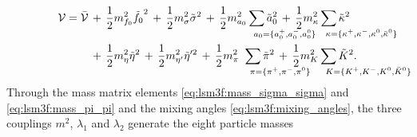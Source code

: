 \begin{equation}
\begin{split}
	\pot = \bar{\pot} \, &+ \, \frac12 m^2_{f_0} \tilde{f_0}^2  \, + \, \frac12 m^2_{\sigma} \tilde{\sigma}^2 \, + \, \frac12 m^2_{a_0} \sum_{\mathrlap{\!\!a_0 = \{a_0^+,a_0^-,a_0^0\}}} \tilde{a}_0^2               \, + \, \frac12 m^2_{\kappa} \sum_{\mathrlap{\!\!\kappa = \{\kappa^+,\kappa^-,\kappa^0,\bar{\kappa}^0\}}} \tilde{\kappa}^2 \\
	                  \, &+ \, \frac12 m^2_{\eta} \tilde{\eta}^2 \, + \, \frac12 m^2_{\eta'} \tilde{\eta}'^2   \, + \, \frac12 m^2_{\pi_{\phantom{0}}} \sum_{\mathrlap{\!\!\pi = \{\pi^+,\pi^-,\pi^0\}}} \tilde{\pi}^2 \, + \, \frac12 m^2_{K} \sum_{\mathrlap{\!\!K = \{K^+,K^-,K^0,\bar{K}^0\}}} \tilde{K}^2. \\
\end{split}
\label{eq:lsm3f:potential_after_diagonalization}
\end{equation}
Through the mass matrix elements \eqref{eq:lsm3f:mass_sigma_sigma} and \eqref{eq:lsm3f:mass_pi_pi} and the mixing angles \eqref{eq:lsm3f:mixing_angles},
the three couplings $m^2$, $\lambda_1$ and $\lambda_2$ generate the eight particle masses
